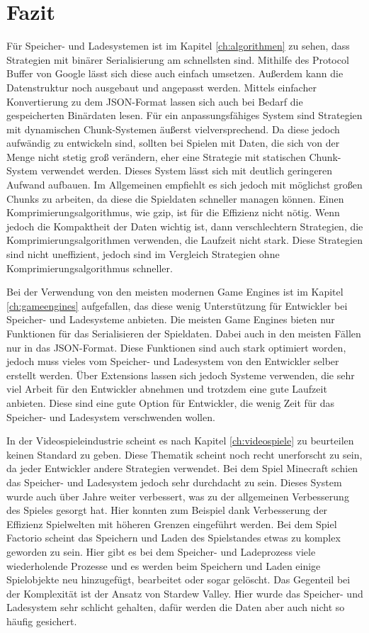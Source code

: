 \chapter{Fazit}\label{ch:fazit}
Für Speicher- und Ladesystemen ist im Kapitel \ref{ch:algorithmen} zu sehen, dass Strategien mit binärer Serialisierung am schnellsten sind. Mithilfe des Protocol Buffer von Google lässt sich diese auch einfach umsetzen. Außerdem kann die Datenstruktur noch ausgebaut und angepasst werden. Mittels einfacher Konvertierung zu dem JSON-Format lassen sich auch bei Bedarf die gespeicherten Binärdaten lesen. Für ein anpassungsfähiges System sind Strategien mit dynamischen Chunk-Systemen äußerst vielversprechend. Da diese jedoch aufwändig zu entwickeln sind, sollten bei Spielen mit Daten, die sich von der Menge nicht stetig groß verändern, eher eine Strategie mit statischen Chunk-System verwendet werden. Dieses System lässt sich mit deutlich geringeren Aufwand aufbauen. Im Allgemeinen empfiehlt es sich jedoch mit möglichst großen Chunks zu arbeiten, da diese die Spieldaten schneller managen können. Einen Komprimierungsalgorithmus, wie \ac{gzip}, ist für die Effizienz nicht nötig. Wenn jedoch die Kompaktheit der Daten wichtig ist, dann verschlechtern Strategien, die Komprimierungsalgorithmen verwenden, die Laufzeit nicht stark. Diese Strategien sind nicht uneffizient, jedoch sind im Vergleich Strategien ohne Komprimierungsalgorithmus schneller.

Bei der Verwendung von den meisten modernen Game Engines ist im Kapitel \ref{ch:gameengines} aufgefallen, das diese wenig Unterstützung für Entwickler bei Speicher- und Ladesysteme anbieten. Die meisten Game Engines bieten nur Funktionen für das Serialisieren der Spieldaten. Dabei auch in den meisten Fällen nur in das JSON-Format. Diese Funktionen sind auch stark optimiert worden, jedoch muss vieles vom Speicher- und Ladesystem von den Entwickler selber erstellt werden. Über Extensions lassen sich jedoch Systeme verwenden, die sehr viel Arbeit für den Entwickler abnehmen und trotzdem eine gute Laufzeit anbieten. Diese sind eine gute Option für Entwickler, die wenig Zeit für das Speicher- und Ladesystem verschwenden wollen.

In der Videospieleindustrie scheint es nach Kapitel \ref{ch:videospiele} zu beurteilen keinen Standard zu geben. Diese Thematik scheint noch recht unerforscht zu sein, da jeder Entwickler andere Strategien verwendet. Bei dem Spiel Minecraft schien das Speicher- und Ladesystem jedoch sehr durchdacht zu sein. Dieses System wurde auch über Jahre weiter verbessert, was zu der allgemeinen Verbesserung des Spieles gesorgt hat. Hier konnten zum Beispiel dank Verbesserung der Effizienz Spielwelten mit höheren Grenzen eingeführt werden. Bei dem Spiel Factorio scheint das Speichern und Laden des Spielstandes etwas zu komplex geworden zu sein. Hier gibt es bei dem Speicher- und Ladeprozess viele wiederholende Prozesse und es werden beim Speichern und Laden einige Spielobjekte neu hinzugefügt, bearbeitet oder sogar gelöscht. Das Gegenteil bei der Komplexität ist der Ansatz von Stardew Valley. Hier wurde das Speicher- und Ladesystem sehr schlicht gehalten, dafür werden die Daten aber auch nicht so häufig gesichert. 

